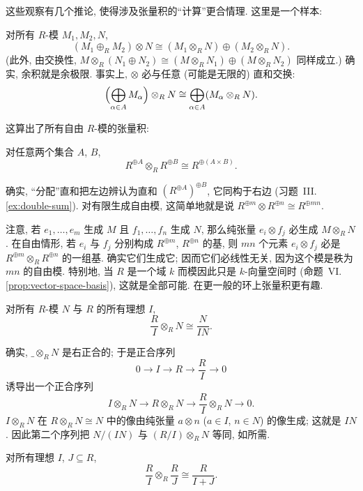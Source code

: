 这些观察有几个推论, 使得涉及张量积的``计算''更合情理. 这里是一个样本:

\begin{corollary}\label{cor:tensor-direct-sum}
对所有 $R$-模 $M_1,M_2,N$,
\[
(M_1\oplus_R M_2)\otimes N\cong(M_1\otimes_R N)\oplus(M_2\otimes_R N).
\]
(此外, 由交换性, $M\otimes_R(N_1\oplus N_2)\cong(M\otimes_R N_1)\oplus(M\otimes_R N_2)$ 同样成立.) 确实, 余积就是余极限. 事实上, $\otimes$ 必与任意 (可能是无限的) 直和交换:
\[
\Bigl(\bigoplus_{\alpha\in A}M_\alpha\Bigr)\otimes_R N\cong\bigoplus_{\alpha\in A}(M_\alpha\otimes_R N).
\]
\end{corollary}

这算出了所有自由 $R$-模的张量积:

\begin{corollary}\label{cor:tensor-free}
对任意两个集合 $A$, $B$,
\[
R^{\oplus A}\otimes_R R^{\oplus B}\cong R^{\oplus(A\times B)}.
\]
\end{corollary}

确实, ``分配''直和把左边辨认为直和 $(R^{\oplus A})^{\oplus B}$, 它同构于右边 (习题~III.\ref{ex:double-sum}). 对有限生成自由模, 这简单地就是说 $R^{\oplus m}\otimes R^{\oplus n}\cong R^{\oplus mn}$.

注意, 若 $e_1,\dots,e_m$ 生成 $M$ 且 $f_1,\dots,f_n$ 生成 $N$, 那么纯张量 $e_i\otimes f_j$ 必生成 $M\otimes_R N$. 在自由情形, 若 $e_i$ 与 $f_j$ 分别构成 $R^{\oplus m}$, $R^{\oplus n}$ 的基, 则 $mn$ 个元素 $e_i\otimes f_j$ 必是 $R^{\oplus m}\otimes_R R^{\oplus n}$ 的一组基. 确实它们生成它; 因而它们必线性无关, 因为这个模是秩为 $mn$ 的自由模. 特别地, 当 $R$ 是一个域 $k$ 而模因此只是 $k$-向量空间时 (命题~VI.\ref{prop:vector-space-basis}), 这就是全部可能. 在更一般的环上张量积更有趣.

\begin{corollary}\label{cor:tensor-quotient-ideal}
对所有 $R$-模 $N$ 与 $R$ 的所有理想 $I$,
\[
\frac{R}{I}\otimes_R N\cong\frac{N}{IN}.
\]
\end{corollary}

确实, $\_\otimes_R N$ 是右正合的; 于是正合序列
\[
0\longrightarrow I\longrightarrow R\longrightarrow\frac{R}{I}\longrightarrow 0
\]
诱导出一个正合序列
\[
I\otimes_R N\longrightarrow R\otimes_R N\longrightarrow\frac{R}{I}\otimes_R N\longrightarrow 0.
\]
$I\otimes_R N$ 在 $R\otimes_R N\cong N$ 中的像由纯张量 $a\otimes n$ ($a\in I$, $n\in N$) 的像生成; 这就是 $IN$. 因此第二个序列把 $N/(IN)$ 与 $(R/I)\otimes_R N$ 等同, 如所需.

\begin{corollary}\label{cor:tensor-quotient-ideal-2}
对所有理想 $I$, $J\subseteq R$,
\[
\frac{R}{I}\otimes_R\frac{R}{J}\cong\frac{R}{I+J}.
\]
\end{corollary}

